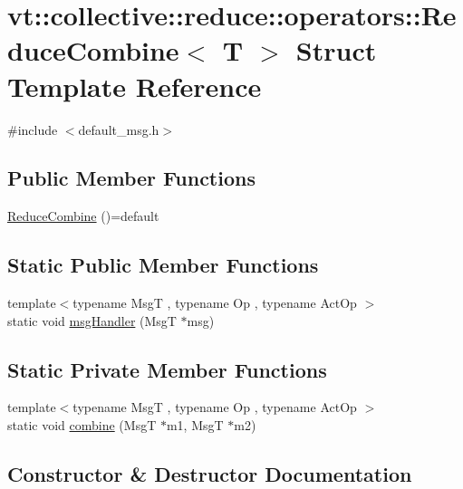 \hypertarget{structvt_1_1collective_1_1reduce_1_1operators_1_1_reduce_combine}{}\section{vt\+:\+:collective\+:\+:reduce\+:\+:operators\+:\+:Reduce\+Combine$<$ T $>$ Struct Template Reference}
\label{structvt_1_1collective_1_1reduce_1_1operators_1_1_reduce_combine}


{\ttfamily \#include $<$default\+\_\+msg.\+h$>$}

\subsection*{Public Member Functions}
\begin{DoxyCompactItemize}
\item 
\hyperlink{structvt_1_1collective_1_1reduce_1_1operators_1_1_reduce_combine_a361c495fceb4ef21a440ee29b425b1f9}{Reduce\+Combine} ()=default
\end{DoxyCompactItemize}
\subsection*{Static Public Member Functions}
\begin{DoxyCompactItemize}
\item 
{\footnotesize template$<$typename MsgT , typename Op , typename Act\+Op $>$ }\\static void \hyperlink{structvt_1_1collective_1_1reduce_1_1operators_1_1_reduce_combine_aa1657dc492475bc1d82d1dc282ee37ce}{msg\+Handler} (MsgT $\ast$msg)
\end{DoxyCompactItemize}
\subsection*{Static Private Member Functions}
\begin{DoxyCompactItemize}
\item 
{\footnotesize template$<$typename MsgT , typename Op , typename Act\+Op $>$ }\\static void \hyperlink{structvt_1_1collective_1_1reduce_1_1operators_1_1_reduce_combine_a3ac102a9f02db3a907e35607f537407b}{combine} (MsgT $\ast$m1, MsgT $\ast$m2)
\end{DoxyCompactItemize}


\subsection{Constructor \& Destructor Documentation}
\mbox{\label{structvt_1_1collective_1_1reduce_1_1operators_1_1_reduce_combine_a361c495fceb4ef21a440ee29b425b1f9}} 
